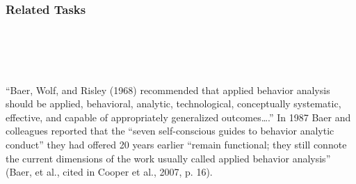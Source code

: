 \subsection{Related Tasks} 
\fouriSeven{}\\
\fourjFour{}\\
%
%
%
%
%
\chapter{\foursecb{}}
\section[\fourbOne{}]{\fourbOne{}%
            }
``Baer, Wolf, and Risley (1968) recommended that applied behavior analysis should be applied, behavioral, analytic, technological, conceptually systematic, effective, and capable of appropriately generalized outcomes….'' In 1987 Baer and colleagues reported that the ``seven self-conscious guides to behavior analytic conduct'' they had offered 20 years earlier ``remain functional; they still connote the current dimensions of the work usually called applied behavior analysis'' (Baer, et al., cited in Cooper et al., 2007, p. 16).
